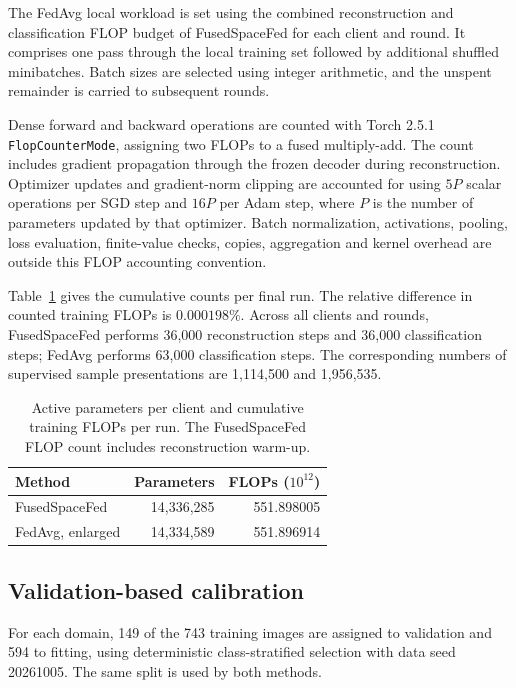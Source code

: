 The FedAvg local workload is set using the combined reconstruction and
classification FLOP budget of FusedSpaceFed for each client and round.
It comprises one pass through the local training set followed by additional
shuffled minibatches. Batch sizes are selected using integer arithmetic,
and the unspent remainder is carried to subsequent rounds.

Dense forward and backward operations are counted with Torch 2.5.1
\texttt{FlopCounterMode}, assigning two FLOPs to a fused multiply-add.
The count includes gradient propagation through the frozen decoder during
reconstruction. Optimizer updates and gradient-norm clipping are accounted
for using $5P$ scalar operations per SGD step and $16P$ per Adam step,
where $P$ is the number of parameters updated by that optimizer.
Batch normalization, activations, pooling, loss evaluation, finite-value
checks, copies, aggregation and kernel overhead are outside this FLOP
accounting convention.

Table~\ref{tab:capacity_compute_resources} gives the cumulative counts
per final run. The relative difference in counted training FLOPs is
$0.000198\%$. Across all clients and rounds, FusedSpaceFed performs
36,000 reconstruction steps and 36,000 classification steps; FedAvg
performs 63,000 classification steps. The corresponding numbers of
supervised sample presentations are 1,114,500 and 1,956,535.

\begin{table}[H]
\coauthorcolor
\centering
\small
\setlength{\tabcolsep}{4pt}
\caption{Active parameters per client and cumulative training FLOPs
per run. The FusedSpaceFed FLOP count includes reconstruction warm-up.}
\label{tab:capacity_compute_resources}
\begin{tabular}{lrr}
\toprule
Method & Parameters & FLOPs ($10^{12}$) \\
\midrule
FusedSpaceFed & 14,336,285 & 551.898005 \\
FedAvg, enlarged & 14,334,589 & 551.896914 \\
\bottomrule
\end{tabular}
\end{table}

\subsection{Validation-based calibration}

For each domain, 149 of the 743 training images are assigned to
validation and 594 to fitting, using deterministic class-stratified
selection with data seed 20261005. The same split is used by both
methods.


